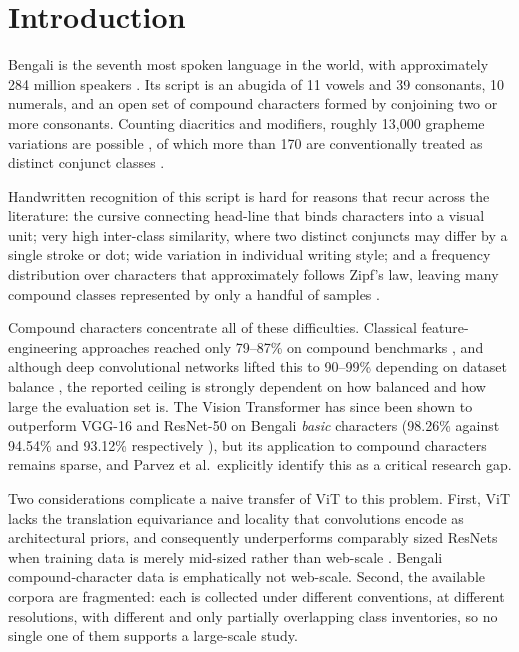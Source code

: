 \hypertarget{introduction}{%
\section{Introduction}\label{introduction}}

Bengali is the seventh most spoken language in the world, with
approximately 284 million speakers \citep{ekushnetnote}. Its
script is an abugida of 11 vowels and 39 consonants, 10 numerals, and an
open set of compound characters formed by conjoining two or more
consonants. Counting diacritics and modifiers, roughly 13,000 grapheme
variations are possible \citep{ref30,ref32}, of which more than 170 are
conventionally treated as distinct conjunct classes \citep{ref7}.

Handwritten recognition of this script is hard for reasons that recur
across the literature: the cursive connecting head-line that
binds characters into a visual unit; very high inter-class similarity,
where two distinct conjuncts may differ by a single stroke or dot; wide
variation in individual writing style; and a frequency distribution over
characters that approximately follows Zipf's law, leaving many compound
classes represented by only a handful of samples \citep{ref33}.

Compound characters concentrate all of these difficulties. Classical
feature-engineering approaches reached only 79--87\% on compound
benchmarks \citep{ref2,ref3,ref4,ref5}, and although deep convolutional networks
lifted this to 90--99\% depending on dataset balance \citep{ref9,ref16,ref23}, the reported ceiling is strongly dependent on how balanced and
how large the evaluation set is. The Vision Transformer \citep{ref22} has
since been shown to outperform VGG-16 and ResNet-50 on Bengali
\emph{basic} characters (98.26\% against 94.54\% and 93.12\%
respectively \citep{ref17}), but its application to compound characters
remains sparse, and Parvez et al.~explicitly identify this as a critical
research gap.

Two considerations complicate a naive transfer of ViT to this problem.
First, ViT lacks the translation equivariance and locality that
convolutions encode as architectural priors, and consequently
underperforms comparably sized ResNets when training data is merely
mid-sized rather than web-scale \citep{ref22}. Bengali compound-character
data is emphatically not web-scale. Second, the available corpora are
fragmented: each is collected under different conventions, at different
resolutions, with different and only partially overlapping class
inventories, so no single one of them supports a large-scale study.

